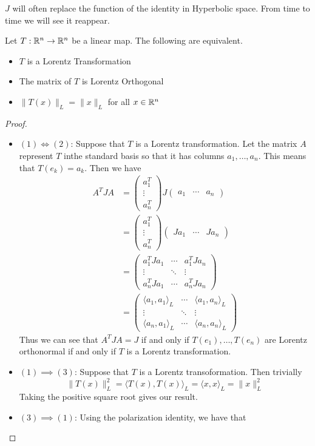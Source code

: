 \documentclass[a4paper]{article}
\begin{document}
$J$ will often replace the function of the identity in Hyperbolic space. From time to time we will see it reappear. 

\begin{prp}{}{} Let $T:\mathbb{R}^n\to\mathbb{R}^n$ be a linear map. The following are equivalent. 
\begin{itemize}
\item $T$ is a Lorentz Transformation
\item The matrix of $T$ is Lorentz Orthogonal
\item $\|T(x)\|_L=\|x\|_L$ for all $x\in\mathbb{R}^n$
\end{itemize} \tcbline
\begin{proof}~\\
\begin{itemize}
\item $(1)\iff(2)$: Suppose that $T$ is a Lorentz transformation. Let the matrix $A$ represent $T$ inthe standard basis so that it has columns $a_1,\dots,a_n$. This means that $T(e_k)=a_k$. Then we have 
\begin{align*}
A^TJA&=\begin{pmatrix}
a_1^T\\\vdots\\a_n^T
\end{pmatrix}J\begin{pmatrix}
a_1 & \cdots & a_n
\end{pmatrix}\\
&=\begin{pmatrix}
a_1^T\\\vdots\\a_n^T
\end{pmatrix}\begin{pmatrix}
Ja_1 & \cdots & Ja_n
\end{pmatrix}\\
&=\begin{pmatrix}
a_1^TJa_1 & \cdots & a_1^TJa_n\\
\vdots & \ddots & \vdots\\
a_n^TJa_1 & \cdots & a_n^TJa_n
\end{pmatrix}\\
&=\begin{pmatrix}
\langle a_1,a_1\rangle_L & \cdots & \langle a_1,a_n\rangle_L\\
\vdots & \ddots & \vdots\\
\langle a_n,a_1\rangle_L & \cdots & \langle a_n,a_n\rangle_L
\end{pmatrix}
\end{align*}
Thus we can see that $A^TJA=J$ if and only if $T(e_1),\dots, T(e_n)$ are Lorentz orthonormal if and only if $T$ is a Lorentz transformation. 
\item $(1)\implies(3)$: Suppose that $T$ is a Lorentz transoformation. Then trivially $$\|T(x)\|_L^2=\langle T(x),T(x)\rangle_L=\langle x,x\rangle_L=\|x\|_L^2$$ Taking the positive square root gives our result. 
\item $(3)\implies(1)$: Using the polarization identity, we have that 
\end{itemize}
\end{proof}
\end{prp}
\end{document}
